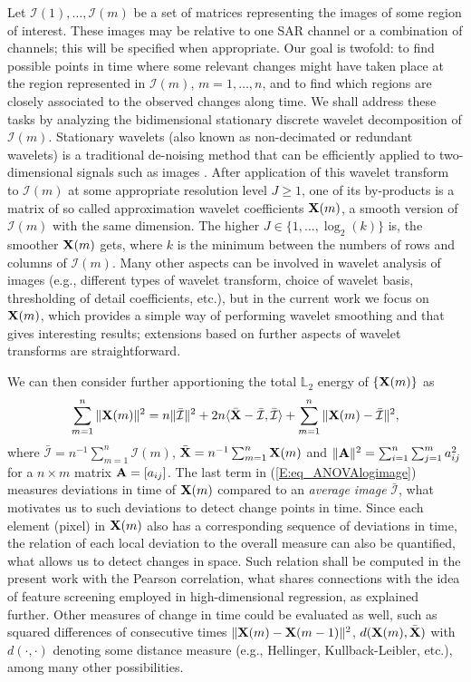 \documentclass[journal]{IEEEtran}
\newcommand{\vA}{{\textbf A}}
\newcommand{\vX}{{\textbf X}}
\begin{document}
Let $\mathcal{I}(1),\ldots,\mathcal{I}(m)$ be a set of matrices representing the images of some region of interest. These images may be relative to one SAR channel or a combination of channels; this will be specified when appropriate. Our goal is twofold: to find possible points in time where some relevant changes might have taken place at the region represented in $\mathcal{I}(m)$, $m=1,\ldots,n$, and to find which regions are closely associated to the observed changes along time. We shall address these tasks by analyzing the bidimensional stationary discrete wavelet decomposition of $\mathcal{I}(m)$. Stationary wavelets (also known as non-decimated or redundant wavelets) is a traditional de-noising method that can be efficiently applied to two-dimensional signals such as images \cite{coifman1995translation,atto2012multidate,atto2016wavelet}. After application of this wavelet transform to $\mathcal{I}(m)$ at some appropriate resolution level $J\geq 1$, one of its by-products is a matrix of so called approximation wavelet coefficients $\vX(m)$, a smooth version of $\mathcal{I}(m)$ with the same dimension. The higher $J\in\{1,\ldots,\log_2(k)\}$ is, the smoother $\vX(m)$ gets, where $k$ is the minimum between the numbers of rows and columns of $\mathcal{I}(m)$. Many other aspects can be involved in wavelet analysis of images (e.g., different types of wavelet transform, choice of wavelet basis, thresholding of detail coefficients, etc.), but in the current work we focus on $\vX(m)$, which provides a simple way of performing wavelet smoothing and that gives interesting results; extensions based on further aspects of wavelet transforms are straightforward.

We can then consider further apportioning the total $\mathbb{L}_2$ energy of $\left\{\vX(m)\right\}$ as
\begin{equation} 
\sum_{m=1}^n\|\vX(m)\|^2 = n\|\bar{\mathcal{I}}\|^2+2n\langle\bar{\vX}-\bar{\mathcal{I}},\bar{\mathcal{I}}\rangle+\sum_{m=1}^n\|\mathcal \vX(m)-\bar{\mathcal{I}}\|^2,\label{E:eq_ANOVAlogimage}
\end{equation}
where $\bar{\mathcal{I}}=n^{-1}\sum_{m=1}^n\mathcal{I}(m)$, $\bar{\vX}=n^{-1}\sum_{m=1}^n\vX(m)$ and $\|\vA\|^2=\sum_{i=1}^n\sum_{j=1}^m a_{ij}^2$ for a $n\times m$ matrix $\vA=[a_{ij}]$. The last term in (\ref{E:eq_ANOVAlogimage}) measures deviations in time of $\vX(m)$ compared to an {\it average image} $\bar{\mathcal{I}}$, what motivates us to such deviations to detect change points in time. Since each element (pixel) in $\vX(m)$ also has a corresponding sequence of deviations in time, the relation of each local deviation to the overall measure can also be quantified, what allows us to detect changes in space. Such relation shall be computed in the present work with the Pearson correlation, what shares connections with the idea of feature screening employed in high-dimensional regression, as explained further. Other measures of change in time could be evaluated as well, such as squared differences of consecutive times $\|\mathcal \vX(m)-\vX(m-1)\|^2$, $d(\vX(m),\bar{\vX})$ with $d(\cdot,\cdot)$ denoting some distance measure (e.g., Hellinger, Kullback-Leibler, etc.), among many other possibilities.
\end{document}
